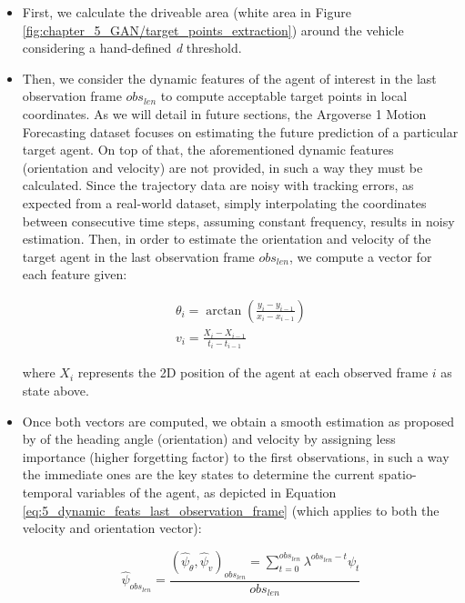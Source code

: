 \begin{itemize}
	
	\item First, we calculate the driveable area (white area in Figure \ref{fig:chapter_5_GAN/target_points_extraction}) around the vehicle considering a hand-defined \textit{d} threshold.
	
	\item Then, we consider the dynamic features of the agent of interest in the last observation frame $obs_{len}$ to compute acceptable target points in local coordinates. As we will detail in future sections, the Argoverse 1 Motion Forecasting dataset focuses on estimating the future prediction of a particular target agent. On top of that, the aforementioned dynamic features (orientation and velocity) are not provided, in such a way they must be calculated. Since the trajectory data are noisy with tracking errors, as expected from a real-world dataset, simply interpolating the coordinates between consecutive time steps, assuming constant frequency, results in noisy estimation. Then, in order to estimate the orientation and velocity of the target agent in the last observation frame $obs_{len}$, we compute a vector for each feature given:
	
	\begin{equation}
		\begin{split}
			\theta_{i}=\arctan{(\frac{y_{i}-y_{i-1}}{x_{i}-x_{i-1}})} \\
			v_{i}=\frac{X_{i}-X_{i-1}}{t_{i}-t_{i-1}} 
		\end{split}
	\end{equation}
	
	where $X_{i}$ represents the 2D position of the agent at each observed frame $i$ as state above.
	
	\item Once both vectors are computed, we obtain a smooth estimation as proposed by \cite{tang2021exploring} of the heading angle (orientation) and velocity by assigning less importance (higher forgetting factor) to the first observations, in such a way the immediate ones are the key states to determine the current spatio-temporal variables of the agent, as depicted in Equation \ref{eq:5_dynamic_feats_last_observation_frame} (which applies to both the velocity and orientation vector):
	
	\begin{equation}
		\hat{\psi}_{obs_{len}} = \frac{(\hat{\psi}_{\theta}, \hat{\psi}_v)_{obs_{len}} = \sum_{t=0}^{obs_{len}}\lambda^{obs_{len} - t}\psi_t}{obs_{len}}
		\label{eq:5_dynamic_feats_last_observation_frame}
	\end{equation}
	

\end{itemize}
